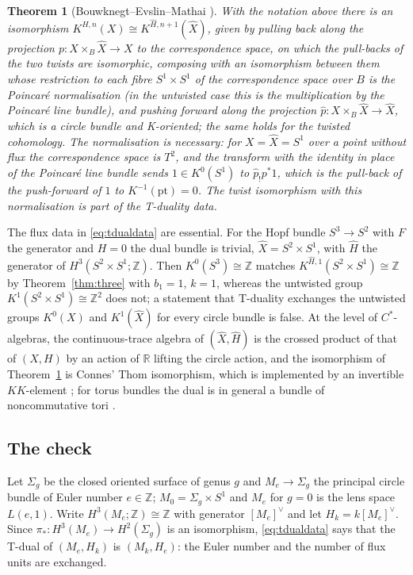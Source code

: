 \documentclass[reqno,11pt]{amsart}
\newtheorem{theorem}{Theorem}[section]
\theoremstyle{definition}
\newcommand{\ZZ}{\mathbb{Z}}
\newcommand{\RR}{\mathbb{R}}
\newcommand{\KK}{K\!K}
\begin{document}
\begin{theorem}[Bouwknegt--Evslin--Mathai \cite{BEM04a,BEM04b}]\label{thm:bem}
With the notation above there is an isomorphism $K^{H,n}(X)\cong K^{\widehat H,n+1}(\widehat X)$, given by pulling back along the projection $p\colon X\times_B\widehat X\to X$ to the correspondence space, on which the pull-backs of the two twists are isomorphic, composing with an isomorphism between them whose restriction to each fibre $S^1\times S^1$ of the correspondence space over $B$ is the Poincar\'e normalisation (in the untwisted case this is the multiplication by the Poincar\'e line bundle), and pushing forward along the projection $\widehat p\colon X\times_B\widehat X\to\widehat X$, which is a circle bundle and K-oriented; the same holds for the twisted cohomology. The normalisation is necessary: for $X=\widehat X=S^1$ over a point without flux the correspondence space is $T^2$, and the transform with the identity in place of the Poincar\'e line bundle sends $1\in K^0(S^1)$ to $\widehat p_!p^*1$, which is the pull-back of the push-forward of $1$ to $K^{-1}(\mathrm{pt})=0$. The twist isomorphism with this normalisation is part of the T-duality data.
\end{theorem}

The flux data in \eqref{eq:tdualdata} are essential. For the Hopf bundle $S^3\to S^2$ with $F$ the generator and $H=0$ the dual bundle is trivial, $\widehat X=S^2\times S^1$, with $\widehat H$ the generator of $H^3(S^2\times S^1;\ZZ)$. Then $K^0(S^3)\cong\ZZ$ matches $K^{\widehat H,1}(S^2\times S^1)\cong\ZZ$ by Theorem~\ref{thm:three} with $b_1=1$, $k=1$, whereas the untwisted group $K^1(S^2\times S^1)\cong\ZZ^2$ does not; a statement that T-duality exchanges the untwisted groups $K^0(X)$ and $K^1(\widehat X)$ for every circle bundle is false. At the level of $C^*$-algebras, the continuous-trace algebra of $(\widehat X,\widehat H)$ is the crossed product of that of $(X,H)$ by an action of $\RR$ lifting the circle action, and the isomorphism of Theorem~\ref{thm:bem} is Connes' Thom isomorphism, which is implemented by an invertible $\KK$-element \cite{MR05}; for torus bundles the dual is in general a bundle of noncommutative tori \cite{BHM04,MR05}.

\subsection{The check}
Let $\Sigma_g$ be the closed oriented surface of genus $g$ and $M_e\to\Sigma_g$ the principal circle bundle of Euler number $e\in\ZZ$; $M_0=\Sigma_g\times S^1$ and $M_e$ for $g=0$ is the lens space $L(e,1)$. Write $H^3(M_e;\ZZ)\cong\ZZ$ with generator $[M_e]^\vee$ and let $H_k=k[M_e]^\vee$. Since $\pi_*\colon H^3(M_e)\to H^2(\Sigma_g)$ is an isomorphism, \eqref{eq:tdualdata} says that the T-dual of $(M_e,H_k)$ is $(M_k,H_e)$: the Euler number and the number of flux units are exchanged.
\end{document}
